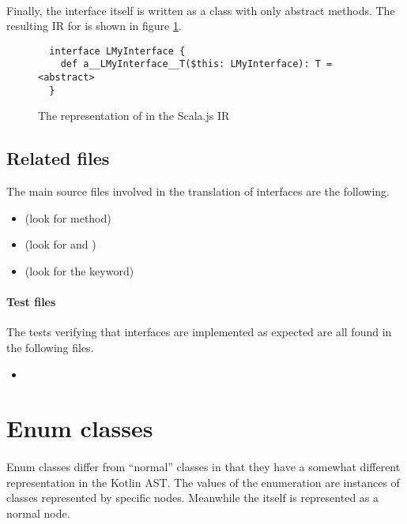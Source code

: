 \paragraph{} Finally, the interface itself is written as a class with only abstract methods. The 
resulting IR for  is shown in figure \ref{interface_abstr}.


\begin{figure}[h]
  \begin{verbatim}
  interface LMyInterface {
    def a__LMyInterface__T($this: LMyInterface): T = <abstract>
  }
  \end{verbatim}
  \caption{The representation of  in the Scala.js IR}
  \label{interface_abstr}
\end{figure}

\subsection{Related files} The main source files involved in the translation of interfaces are 
the following.

\begin{itemize}
 \item {} (look for  method)
 \item {} (look for 
 and )
 \item {} (look for the  keyword)
\end{itemize}

\paragraph{Test files} The tests verifying that interfaces are implemented as expected are all 
found in the following files.

\begin{itemize}
 \item {}
\end{itemize}

\section{Enum classes}

\paragraph{} Enum classes differ from \enquote{normal} classes in that they have a somewhat 
different representation in the Kotlin AST. The values of the enumeration are instances of classes 
represented by specific  nodes. Meanwhile the  itself is 
represented as a normal  node.


